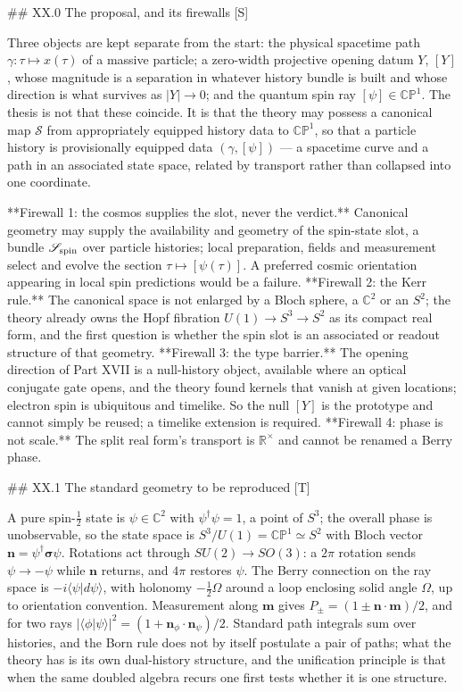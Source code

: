 ## XX.0 The proposal, and its firewalls [S]

Three objects are kept separate from the start: the physical spacetime path $\gamma:\tau\mapsto x(\tau)$ of a massive particle; a zero-width projective opening datum $Y$, $[Y]$, whose magnitude is a separation in whatever history bundle is built and whose direction is what survives as $|Y|\to0$; and the quantum spin ray $[\psi]\in\mathbb{CP}^1$. The thesis is not that these coincide. It is that the theory may possess a canonical map $\mathscr S$ from appropriately equipped history data to $\mathbb{CP}^1$, so that a particle history is provisionally equipped data $(\gamma,[\psi])$ — a spacetime curve and a path in an associated state space, related by transport rather than collapsed into one coordinate.

**Firewall 1: the cosmos supplies the slot, never the verdict.** Canonical geometry may supply the availability and geometry of the spin-state slot, a bundle $\mathscr S_{\rm spin}$ over particle histories; local preparation, fields and measurement select and evolve the section $\tau\mapsto[\psi(\tau)]$. A preferred cosmic orientation appearing in local spin predictions would be a failure. **Firewall 2: the Kerr rule.** The canonical space is not enlarged by a Bloch sphere, a $\mathbb C^2$ or an $S^2$; the theory already owns the Hopf fibration $U(1)\to S^3\to S^2$ as its compact real form, and the first question is whether the spin slot is an associated or readout structure of that geometry. **Firewall 3: the type barrier.** The opening direction of Part XVII is a null-history object, available where an optical conjugate gate opens, and the theory found kernels that vanish at given locations; electron spin is ubiquitous and timelike. So the null $[Y]$ is the prototype and cannot simply be reused; a timelike extension is required. **Firewall 4: phase is not scale.** The split real form's transport is $\mathbb R^\times$ and cannot be renamed a Berry phase.

## XX.1 The standard geometry to be reproduced [T]

A pure spin-$\tfrac12$ state is $\psi\in\mathbb C^2$ with $\psi^\dagger\psi = 1$, a point of $S^3$; the overall phase is unobservable, so the state space is $S^3/U(1) = \mathbb{CP}^1\simeq S^2$ with Bloch vector $\mathbf n = \psi^\dagger\boldsymbol\sigma\psi$. Rotations act through $SU(2)\to SO(3)$: a $2\pi$ rotation sends $\psi\to-\psi$ while $\mathbf n$ returns, and $4\pi$ restores $\psi$. The Berry connection on the ray space is $-i\langle\psi|d\psi\rangle$, with holonomy $-\tfrac12\Omega$ around a loop enclosing solid angle $\Omega$, up to orientation convention. Measurement along $\mathbf m$ gives $P_\pm = (1\pm\mathbf n\cdot\mathbf m)/2$, and for two rays $|\langle\phi|\psi\rangle|^2 = (1+\mathbf n_\phi\cdot\mathbf n_\psi)/2$. Standard path integrals sum over histories, and the Born rule does not by itself postulate a pair of paths; what the theory has is its own dual-history structure, and the unification principle is that when the same doubled algebra recurs one first tests whether it is one structure.

